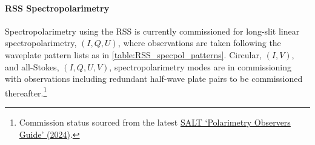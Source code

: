 \paragraph{\gls{RSS} Spectropolarimetry} \label{sec:RSS_reductions}

Spectropolarimetry using the \gls{RSS} is currently commissioned for long-slit linear spectro\-polarimetry, $(I, Q, U)$, where observations are taken following the waveplate pattern lists as in \autoref{table:RSS_specpol_patterns}.
Circular, $(I, V)$, and all-Stokes, $(I, Q, U, V)$, spectropolarimetry modes are in commissioning with observations including redundant half-wave plate pairs to be commissioned thereafter.\footnote{Commission status sourced from the latest \href{https://astronomers.salt.ac.za/wp-content/uploads/sites/71/2022/06/3170AM0013_Polarimetry_Observers_Guide_V1.2.pdf}{SALT `Polarimetry Observers Guide' (2024)}.}

\pagebreak




